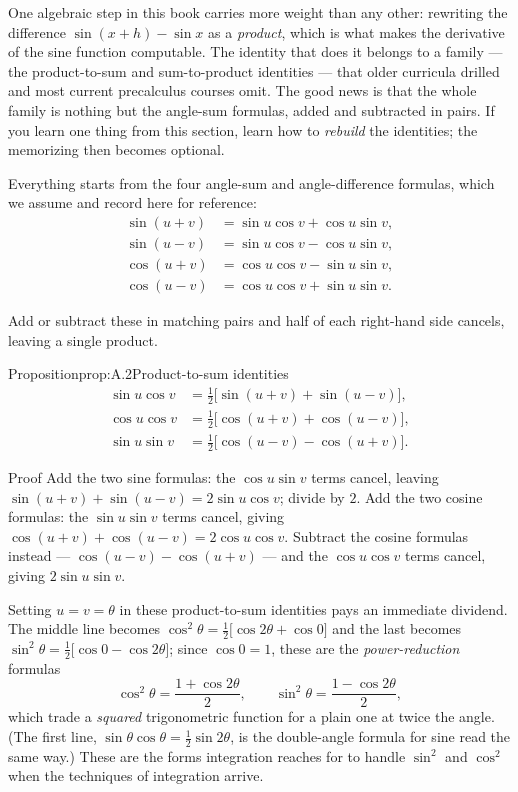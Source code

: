 \documentclass[a4paper,12pt,oneside]{memoir}
\begin{document}
One algebraic step in this book carries more weight than any other: rewriting the difference \(\sin(x+h) - \sin x\) as a \emph{product}, which is what makes the derivative of the sine function computable. The identity that does it belongs to a family — the product-to-sum and sum-to-product identities — that older curricula drilled and most current precalculus courses omit. The good news is that the whole family is nothing but the angle-sum formulas, added and subtracted in pairs. If you learn one thing from this section, learn how to \emph{rebuild} the identities; the memorizing then becomes optional.

Everything starts from the four angle-sum and angle-difference formulas, which we assume and record here for reference: \[ \begin{aligned} \sin(u + v) &= \sin u \cos v + \cos u \sin v, \\ \sin(u - v) &= \sin u \cos v - \cos u \sin v, \\ \cos(u + v) &= \cos u \cos v - \sin u \sin v, \\ \cos(u - v) &= \cos u \cos v + \sin u \sin v. \end{aligned} \]

Add or subtract these in matching pairs and half of each right-hand side cancels, leaving a single product.

\begin{envproposition}{Proposition}{prop:A.2}{Product-to-sum identities}
\[ \begin{aligned} \sin u \cos v &= \tfrac{1}{2}\bigl[\sin(u + v) + \sin(u - v)\bigr], \\ \cos u \cos v &= \tfrac{1}{2}\bigl[\cos(u + v) + \cos(u - v)\bigr], \\ \sin u \sin v &= \tfrac{1}{2}\bigl[\cos(u - v) - \cos(u + v)\bigr]. \end{aligned} \]
\end{envproposition}
\begin{envproof}{Proof}{}{}
Add the two sine formulas: the \(\cos u \sin v\) terms cancel, leaving \(\sin(u+v) + \sin(u-v) = 2 \sin u \cos v\); divide by \(2\). Add the two cosine formulas: the \(\sin u \sin v\) terms cancel, giving \(\cos(u+v) + \cos(u-v) = 2 \cos u \cos v\). Subtract the cosine formulas instead — \(\cos(u-v) - \cos(u+v)\) — and the \(\cos u \cos v\) terms cancel, giving \(2 \sin u \sin v\). \qedmark
\end{envproof}
Setting \(u = v = \theta\) in these product-to-sum identities pays an immediate dividend. The middle line becomes \(\cos^{2}\theta = \tfrac{1}{2}\bigl[\cos 2\theta + \cos 0\bigr]\) and the last becomes \(\sin^{2}\theta = \tfrac{1}{2}\bigl[\cos 0 - \cos 2\theta\bigr]\); since \(\cos 0 = 1\), these are the \emph{power-reduction} formulas \[ \cos^{2}\theta = \frac{1 + \cos 2\theta}{2}, \qquad \sin^{2}\theta = \frac{1 - \cos 2\theta}{2}, \] which trade a \emph{squared} trigonometric function for a plain one at twice the angle. (The first line, \(\sin\theta \cos\theta = \tfrac{1}{2}\sin 2\theta\), is the double-angle formula for sine read the same way.) These are the forms integration reaches for to handle \(\sin^{2}\) and \(\cos^{2}\) when the techniques of integration arrive.
\end{document}
